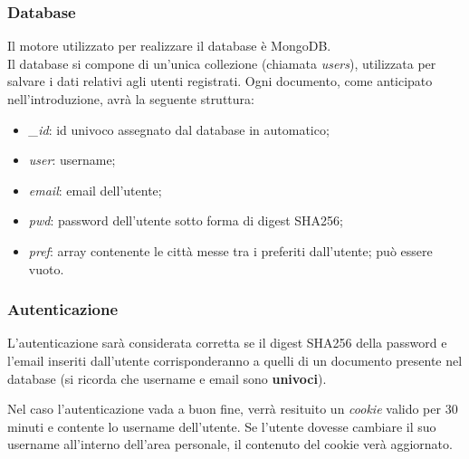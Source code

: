 \subsubsection{Database}

Il motore utilizzato per realizzare il database è MongoDB.\\
Il database si compone di un'unica collezione (chiamata \emph{users}), utilizzata per salvare i dati relativi agli utenti registrati.
Ogni documento, come anticipato nell'introduzione, avrà la seguente struttura:
\begin{itemize}
      \item \emph{\_id}: id univoco assegnato dal database in automatico;
      \item \emph{user}: username;
      \item \emph{email}: email dell'utente;
      \item \emph{pwd}: password dell'utente sotto forma di digest SHA256;
      \item \emph{pref}: array contenente le città messe tra i preferiti dall'utente; può essere vuoto.
\end{itemize}

\subsubsection{Autenticazione}

L'autenticazione sarà considerata corretta se il digest SHA256 della password e l'email inseriti dall'utente corrisponderanno
a quelli di un documento presente nel database (si ricorda che username e email sono \textbf{univoci}).

\vspace{5mm}

Nel caso l'autenticazione vada a buon fine, verrà resituito un \emph{cookie} valido per 30 minuti e contente lo username dell'utente.
Se l'utente dovesse cambiare il suo username all'interno dell'area personale, il contenuto del cookie verà aggiornato.